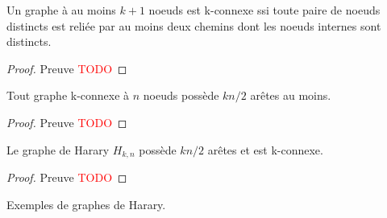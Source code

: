 \begin{mytheo}  
  Un graphe à au moins $k + 1$ noeuds est k-connexe ssi toute paire de noeuds distincts est reliée par au moins deux chemins dont les noeuds internes sont distincts.
  \begin{proof}
     Preuve \textcolor{red}{TODO}
  \end{proof}
\end{mytheo}

\begin{mytheo}  
  Tout graphe k-connexe à $n$ noeuds possède $kn/2$ arêtes au moins.
  \begin{proof}
     Preuve \textcolor{red}{TODO}
  \end{proof}
\end{mytheo}

\begin{mytheo}  
  Le graphe de Harary $H_{k ,n}$ possède $kn/2$ arêtes et est k-connexe.
  \begin{proof}
     Preuve \textcolor{red}{TODO}
  \end{proof}
\end{mytheo}

\begin{myexem}
  Exemples de graphes de Harary.
\end{myexem}